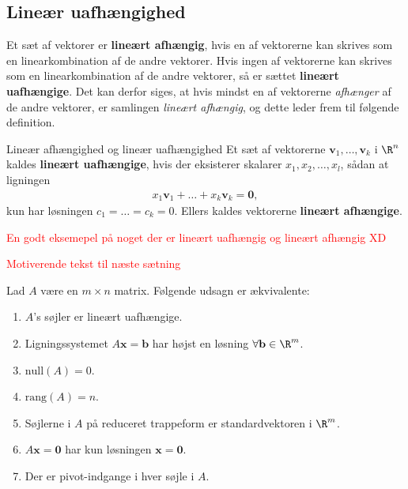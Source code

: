 \subsection{Lineær uafhængighed}
Et sæt af vektorer er \textbf{lineært afhængig}, hvis en af vektorerne kan skrives som en linearkombination af de andre vektorer. Hvis ingen af vektorerne kan skrives som en linearkombination af de andre vektorer, så er sættet \textbf{lineært uafhængige}. Det kan derfor siges, at hvis mindst en af vektorerne \textit{afhænger} af de andre vektorer, er samlingen \textit{lineært afhængig}, og dette leder frem til følgende definition. 
% 
\begin{defn}{Lineær afhængighed og lineær uafhængighed}{}
Et sæt af vektorerne $\mathbf{v}_1, \ldots , \mathbf{v}_k$ i $\R^n$ kaldes \textbf{lineært uafhængige}, hvis der eksisterer skalarer $x_1,x_2, \ldots , x_l$, sådan at ligningen 
\begin{align*}
x_1\mathbf{v}_1 + \ldots + x_k \mathbf{v}_k = \mathbf{0}, 
\end{align*}
kun har løsningen $c_1 = \ldots = c_k = 0$.
Ellers kaldes vektorerne \textbf{lineært afhængige}.
\end{defn}
%
\begin{eks}
\textcolor{red}{En godt eksemepel på noget der er lineært uafhængig og lineært afhængig XD}
\end{eks}
% 
\textcolor{red}{Motiverende tekst til næste sætning}
%
\begin{thm}{}{}
%
Lad $A$ være en $m \times n$ matrix.
Følgende udsagn er ækvivalente:
%
\begin{enumerate}[label=(\alph*)]
\item $A$'s søjler er lineært uafhængige. 
\item Ligningssystemet $A\mathbf{x}=\mathbf{b}$ har højst en løsning $\forall \mathbf{b} \in \R^m$.
\item $\text{null}(A)=0$.
\item $\text{rang}(A)=n$.
\item Søjlerne i $A$ på reduceret trappeform er standardvektoren i $\R^m$.
\item $A\mathbf{x}=\mathbf{0}$ har kun løsningen $\mathbf{x}=\mathbf{0}$.
\item Der er pivot-indgange i hver søjle i $A$. 
\end{enumerate}
%
\end{thm}
%
